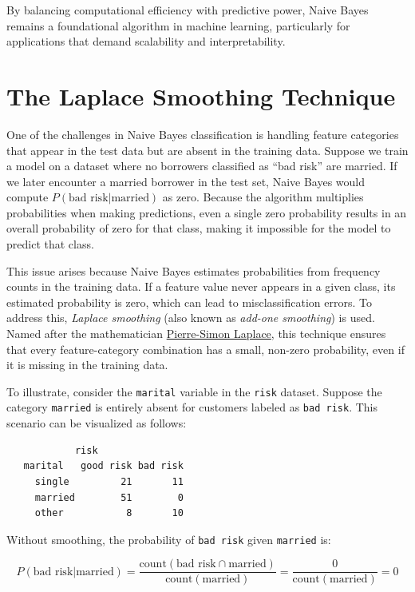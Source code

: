 \documentclass[
]{book}
\newcommand{\passthrough}[1]{#1}
\theoremstyle{definition}
\theoremstyle{definition}
\theoremstyle{definition}
\theoremstyle{definition}
\theoremstyle{remark}
\begin{document}
By balancing computational efficiency with predictive power, Naive Bayes remains a foundational algorithm in machine learning, particularly for applications that demand scalability and interpretability.

\section{The Laplace Smoothing Technique}\label{the-laplace-smoothing-technique}

One of the challenges in Naive Bayes classification is handling feature categories that appear in the test data but are absent in the training data. Suppose we train a model on a dataset where no borrowers classified as ``bad risk'' are married. If we later encounter a married borrower in the test set, Naive Bayes would compute \(P(\text{bad risk} | \text{married})\) as zero. Because the algorithm multiplies probabilities when making predictions, even a single zero probability results in an overall probability of zero for that class, making it impossible for the model to predict that class.

This issue arises because Naive Bayes estimates probabilities from frequency counts in the training data. If a feature value never appears in a given class, its estimated probability is zero, which can lead to misclassification errors. To address this, \emph{Laplace smoothing} (also known as \emph{add-one smoothing}) is used. Named after the mathematician \href{https://en.wikipedia.org/wiki/Pierre-Simon_Laplace}{Pierre-Simon Laplace}, this technique ensures that every feature-category combination has a small, non-zero probability, even if it is missing in the training data.

To illustrate, consider the \passthrough{\lstinline!marital!} variable in the \passthrough{\lstinline!risk!} dataset. Suppose the category \passthrough{\lstinline!married!} is entirely absent for customers labeled as \passthrough{\lstinline!bad risk!}. This scenario can be visualized as follows:

\begin{lstlisting}
            risk
   marital   good risk bad risk
     single         21       11
     married        51        0
     other           8       10
\end{lstlisting}

Without smoothing, the probability of \passthrough{\lstinline!bad risk!} given \passthrough{\lstinline!married!} is:

\[
P(\text{bad risk} | \text{married}) = \frac{\text{count}(\text{bad risk} \cap \text{married})}{\text{count}(\text{married})} = \frac{0}{\text{count}(\text{married})} = 0
\]
\end{document}
